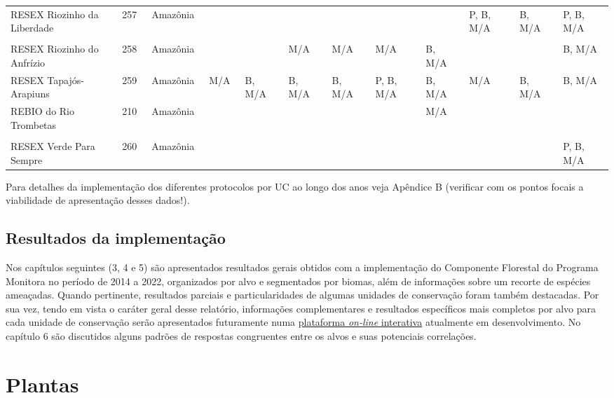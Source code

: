 \documentclass[
  letterpaper,
]{scrbook}
\begin{document}
\begin{longtable}[t]{lllllllll>{}lll}
\addlinespace
RESEX Riozinho da Liberdade  & 257  & Amazônia  &  &  &  &  &  &  & P, B, M/A  & B, M/A  & P, B, M/A \\
 &  &  &  &  &  &  &  &  &  &  \vphantom{1} & \\
RESEX Riozinho do Anfrízio  & 258  & Amazônia  &  &  & M/A  & M/A  & M/A  & B, M/A  &  &  & B, M/A \\
RESEX Tapajós-Arapiuns  & 259  & Amazônia  & M/A  & B, M/A  & B, M/A  & B, M/A  & P, B, M/A  & B, M/A  & M/A  & B, M/A  & B, M/A \\
REBIO do Rio Trombetas  & 210  & Amazônia  &  &  &  &  &  & M/A  &  &  & \\
\addlinespace
 &  &  &  &  &  &  &  &  &  &  & \\
RESEX Verde Para Sempre  & 260  & Amazônia  &  &  &  &  &  &  &  &  & P, B, M/A \\*

\end{longtable}

Para detalhes da implementação dos diferentes protocolos por UC ao longo
dos anos veja Apêndice B (verificar com os pontos focais a viabilidade
de apresentação desses dados!).

\section{Resultados da
implementação}\label{resultados-da-implementauxe7uxe3o}

Nos capítulos seguintes (3, 4 e 5) são apresentados resultados gerais
obtidos com a implementação do Componente Florestal do Programa Monitora
no período de 2014 a 2022, organizados por alvo e segmentados por
biomas, além de informações sobre um recorte de espécies ameaçadas.
Quando pertinente, resultados parciais e particularidades de algumas
unidades de conservação foram também destacadas. Por sua vez, tendo em
vista o caráter geral desse relatório, informações complementares e
resultados específicos mais completos por alvo para cada unidade de
conservação serão apresentados futuramente numa
\href{https://argofix.shinyapps.io/teste_shp/}{plataforma \emph{on-line}
interativa} atualmente em desenvolvimento. No capítulo 6 são discutidos
alguns padrões de respostas congruentes entre os alvos e suas potenciais
correlações.


\chapter{Plantas}\label{plantas}
\end{document}
